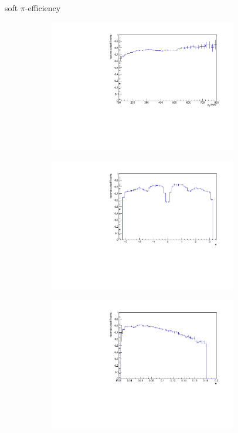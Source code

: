 \documentclass[11pt]{beamer}
\begin{document}
\begin{frame}{soft $\pi$-efficiency}
\begin{figure}
\begin{subfigure}{0.45\textwidth}
\includegraphics[width=0.9\textwidth]{up_pdf/pos/h_pt_reco_SPi_pos.pdf}
\end{subfigure}
\begin{subfigure}{0.45\textwidth}
\includegraphics[width=0.9\textwidth]{up_pdf/pos/h_phi_reco_SPi_pos.pdf}
\end{subfigure}
\begin{subfigure}{0.45\textwidth}
\includegraphics[width=0.9\textwidth]{up_pdf/pos/h_theta_reco_SPi_pos.pdf}

\end{subfigure}
\end{figure}
\end{frame}
\end{document}
